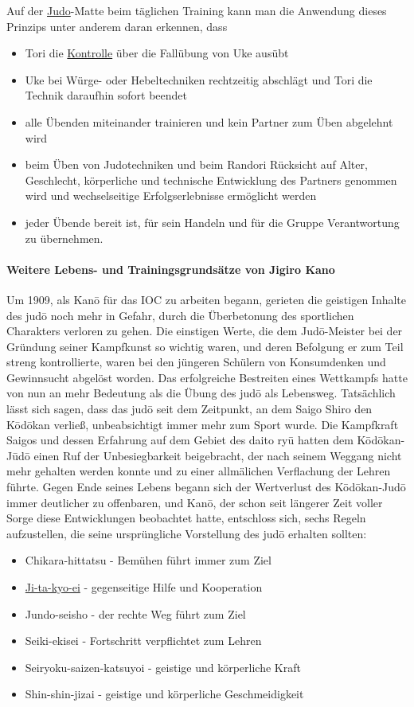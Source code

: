 \documentclass[justified, a4paper, notitlepage, captions=tableheading, nobib]{tufte-handout}
\begin{document}
Auf der \hyperref[org60aba15]{Judo}-Matte beim täglichen Training kann man die Anwendung dieses Prinzips unter anderem daran erkennen, dass 
\begin{itemize}
\item Tori die \hyperref[org15bbf8e]{Kontrolle} über die Fallübung von Uke ausübt
\item Uke bei Würge- oder Hebeltechniken rechtzeitig abschlägt und Tori die Technik daraufhin sofort beendet
\item alle Übenden miteinander trainieren und kein Partner zum Üben abgelehnt wird
\item beim Üben von Judotechniken und beim Randori Rücksicht auf Alter, Geschlecht, körperliche und technische  Entwicklung des Partners genommen wird und wechselseitige Erfolgserlebnisse ermöglicht werden
\item jeder Übende bereit ist, für sein Handeln und für die Gruppe Verantwortung zu übernehmen.
\end{itemize}

\paragraph{Weitere Lebens- und Trainingsgrundsätze von Jigiro Kano}
\label{sec:orgca9e686}
Um 1909, als Kanō für das IOC zu arbeiten begann, gerieten die geistigen Inhalte des judō noch mehr in Gefahr, durch die Überbetonung des sportlichen Charakters verloren zu gehen. Die einstigen Werte, die dem Judō-Meister bei der Gründung seiner Kampfkunst so wichtig waren, und deren Befolgung er zum Teil streng kontrollierte, waren bei den jüngeren Schülern von Konsumdenken und Gewinnsucht abgelöst worden. Das erfolgreiche Bestreiten eines Wettkampfs hatte von nun an mehr Bedeutung als die Übung des judō als Lebensweg. Tatsächlich lässt sich sagen, dass das judō seit dem Zeitpunkt, an dem Saigo Shiro den Kōdōkan verließ, unbeabsichtigt immer mehr zum Sport wurde. Die Kampfkraft Saigos und dessen Erfahrung auf dem Gebiet des daito ryū hatten dem Kōdōkan-Jūdō einen Ruf der Unbesiegbarkeit beigebracht, der nach seinem Weggang nicht mehr gehalten werden konnte und zu einer allmälichen Verflachung der Lehren führte. Gegen Ende seines Lebens begann sich der Wertverlust des Kōdōkan-Judō immer deutlicher zu offenbaren, und Kanō, der schon seit längerer Zeit voller Sorge diese Entwicklungen beobachtet hatte, entschloss sich, sechs Regeln aufzustellen, die seine ursprüngliche Vorstellung des judō erhalten sollten:

\begin{itemize}
\item Chikara-hittatsu - Bemühen führt immer zum Ziel
\item \hyperref[org2566ca3]{Ji-ta-kyo-ei} - gegenseitige Hilfe und Kooperation
\item Jundo-seisho - der rechte Weg führt zum Ziel
\item Seiki-ekisei - Fortschritt verpflichtet zum Lehren
\item Seiryoku-saizen-katsuyoi - geistige und körperliche Kraft
\item Shin-shin-jizai - geistige und körperliche Geschmeidigkeit
\end{itemize}
\end{document}
